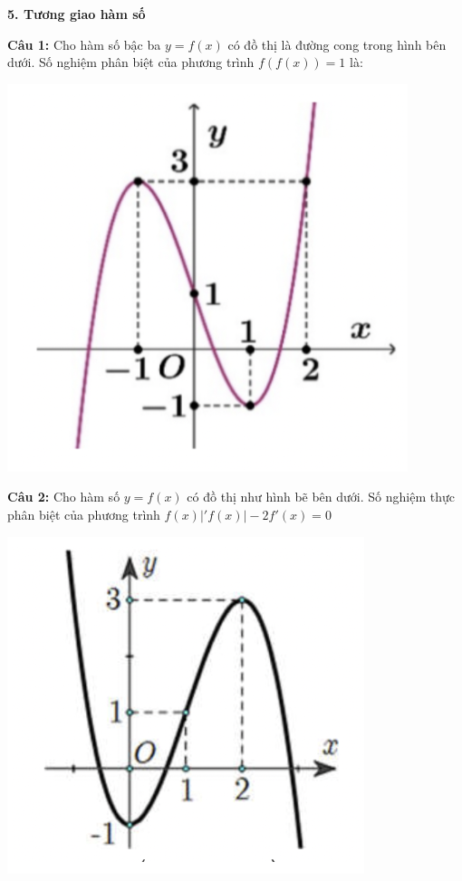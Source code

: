 \documentclass[12pt, a4paper]{article}
\begin{document}

	\textbf{5. Tương giao hàm số}
	
		\textbf{Câu 1: } Cho hàm số bậc ba $y=f(x)$ có đồ thị là đường cong trong hình bên dưới. Số nghiệm phân biệt của phương trình $f(f(x))=1$ là:

\vspace{-0.6cm}		
		
			\begin{center}
				\includegraphics[scale=0.6]{../images/tuonggiao_cau1.png}
			\end{center}
			
\vspace{-0.6cm}			
			
		\textbf{Câu 2: } Cho hàm số $y=f(x)$ có đồ thị như hình bẽ bên dưới. Số nghiệm thực phân biệt của phương trình $f(x)|'f(x)|-2f'(x)=0$
		
\vspace{-0.6cm}		
		
			\begin{center}
				\includegraphics[scale=0.6]{../images/tuonggiao_cau2.png}
			\end{center}
			
\end{document}
